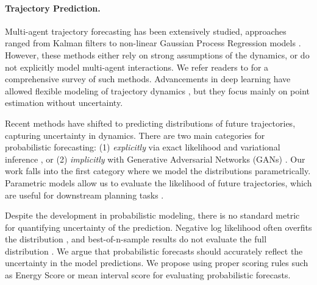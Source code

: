 \paragraph{Trajectory Prediction.} 
%
Multi-agent trajectory forecasting has been extensively studied, 
approaches ranged from Kalman filters \cite{kalman1960} to non-linear Gaussian Process Regression models \cite{gaussianprocess}. However, these methods either rely on strong assumptions of the dynamics, or do not explicitly model multi-agent interactions. We refer readers to \cite{trajpredsurvey} for a comprehensive survey of such methods. 
%
Advancements in deep learning have allowed  flexible modeling of trajectory dynamics \cite{sociallstm, ctsconv, convsocialpooling, sophie, laneGCN, ecco, vectornet, simplex}, but they focus mainly on point estimation without uncertainty. 




Recent methods have shifted to predicting distributions of  future trajectories, capturing uncertainty in dynamics. There are two main categories for probabilistic forecasting: (1) \textit{explicitly} via exact likelihood \cite{mfp, multipath,densetnt} and variational inference \cite{CVAE, trajectron++, desire}, or (2) \textit{implicitly} with Generative Adversarial Networks (GANs) \cite{socialgan,liu2019naomi}. Our work falls into the first category where we model the distributions parametrically. Parametric models allow us to evaluate the likelihood of future trajectories, which are useful for downstream planning tasks \cite{multipath, schwarting2018planning}.

Despite the development in probabilistic modeling, there is no standard metric for quantifying uncertainty of the prediction. Negative log likelihood often overfits the distribution \cite{guo2017calibration}, and best-of-n-sample results do not evaluate the full distribution \cite{rethinking}. We argue that probabilistic forecasts should accurately reflect the uncertainty in the model predictions. We propose using proper scoring rules such as Energy Score or mean interval score \cite{properscoring} for evaluating probabilistic forecasts. 


